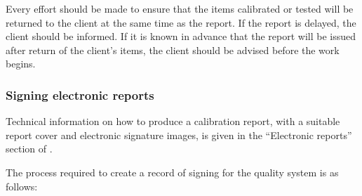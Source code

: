 Every effort should be made to ensure that the items calibrated or tested will be returned to the client at the same time as the report. If the report is delayed, the client should be informed. If it is known in advance that the report will be issued after return of the client's items, the client should be advised before the work begins.

\subsubsection{Signing electronic reports}
\label{sss:electronic_signatures}
Technical information on how to produce a calibration report, with a suitable report cover and electronic signature images, is given in the ``Electronic reports''  section of \cite[\S\ref*{GRP-ss:electronic_reports}]{MSL_Reporting_Guidelines}.

The process required to create a record of signing for the quality system is as follows:

